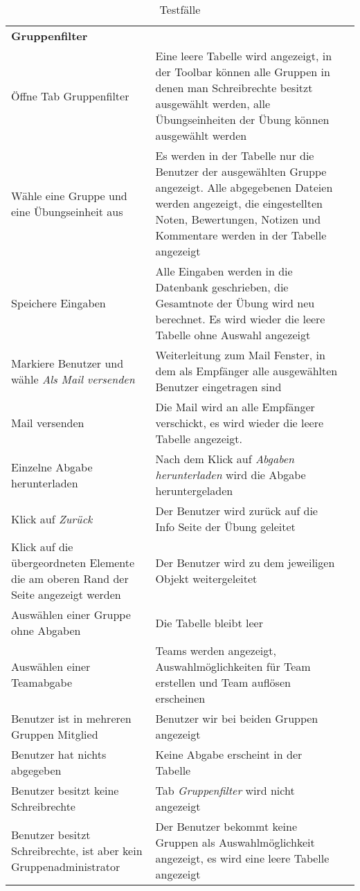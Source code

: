 \begin{table}[]
	\centering
	\caption{Testfälle}
	\label{table4}
	\begin{tabular}{p{6cm}p{7cm}p{3cm}}
			\textbf{Gruppenfilter}  &   &   \\
		    Öffne Tab Gruppenfilter	& Eine leere Tabelle wird angezeigt, in der Toolbar können alle Gruppen in denen man Schreibrechte besitzt ausgewählt werden, alle Übungseinheiten der Übung können ausgewählt werden &\checkmark \\
			Wähle eine Gruppe und eine Übungseinheit aus & Es werden in der Tabelle nur die Benutzer der ausgewählten Gruppe angezeigt. Alle abgegebenen Dateien werden angezeigt, die eingestellten Noten, Bewertungen, Notizen und Kommentare werden in der Tabelle angezeigt &\checkmark \\
			Speichere Eingaben & Alle Eingaben werden in die Datenbank geschrieben, die Gesamtnote der Übung wird neu berechnet. Es wird wieder die leere Tabelle ohne Auswahl angezeigt &\checkmark \\
			Markiere Benutzer und wähle \textit{Als Mail versenden}& Weiterleitung zum Mail Fenster, in dem als Empfänger alle ausgewählten Benutzer eingetragen sind  &\checkmark \\
			Mail versenden & Die Mail wird an alle Empfänger verschickt, es wird wieder die leere Tabelle angezeigt. &\checkmark \\
			Einzelne Abgabe herunterladen & Nach dem Klick auf \textit{Abgaben herunterladen} wird die Abgabe heruntergeladen &\checkmark \\
			Klick auf \textit{Zurück} & Der Benutzer wird zurück auf die Info Seite der Übung geleitet &\checkmark \\
			Klick auf die übergeordneten Elemente die am oberen Rand der Seite angezeigt werden & Der Benutzer wird zu dem jeweiligen Objekt weitergeleitet &\checkmark \\
			Auswählen einer Gruppe ohne Abgaben & Die Tabelle bleibt leer  & \checkmark  \\
			Auswählen einer Teamabgabe 	& Teams werden angezeigt, Auswahlmöglichkeiten für Team erstellen und Team auflösen erscheinen  & \checkmark  \\
			Benutzer ist in mehreren Gruppen Mitglied & Benutzer wir bei beiden Gruppen angezeigt  & \checkmark  \\
			Benutzer hat nichts abgegeben &  Keine Abgabe erscheint in der Tabelle & \checkmark  \\
			Benutzer besitzt keine Schreibrechte & Tab \textit{Gruppenfilter} wird nicht angezeigt  & \checkmark  \\
			Benutzer besitzt Schreibrechte, ist aber kein Gruppenadministrator & Der Benutzer bekommt keine Gruppen als Auswahlmöglichkeit angezeigt, es wird eine leere Tabelle angezeigt  & \checkmark  \\
			
			

	\end{tabular}
\end{table}

